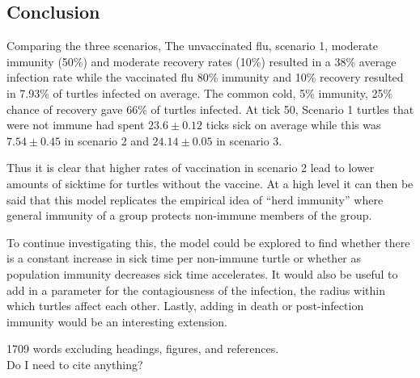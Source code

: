 \documentclass[11pt]{article} %
\begin{document}
\subsection{Conclusion}

Comparing the three scenarios, The unvaccinated flu, scenario 1, moderate immunity (50\%) and moderate recovery rates (10\%) resulted in a 38\% average infection rate while the vaccinated flu 80\% immunity and 10\% recovery resulted in 7.93\% of turtles infected on average. The common cold, 5\% immunity, 25\% chance of recovery gave 66\% of turtles infected. At tick 50, Scenario 1 turtles that were not immune had spent $23.6 \pm 0.12$ ticks sick on average while this was $7.54 \pm 0.45$ in scenario 2 and $24.14 \pm 0.05$ in scenario 3. 

Thus it is clear that higher rates of vaccination in scenario 2 lead to lower amounts of sicktime for turtles without the vaccine. At a high level it can then be said that this model replicates the empirical idea of ``herd immunity'' where general immunity of a group protects non-immune members of the group. 

To continue investigating this, the model could be explored to find whether there is a constant increase in sick time per non-immune turtle or whether as population immunity decreases sick time accelerates. It would also be useful to add in a parameter for the contagiousness of the infection, the radius within which turtles affect each other. Lastly, adding in death or post-infection immunity would be an interesting extension. 


1709 words excluding headings, figures, and references. \\

Do I need to cite anything? 

\nocite{*}


\printbibliography
\end{document}
